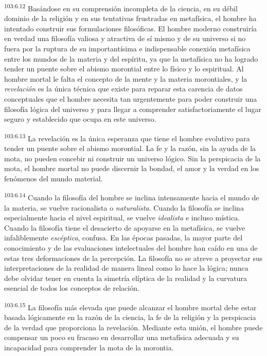 \documentclass[twoside, 11pt]{book}
\begin{document}
\par
\textsuperscript{103:6.12} Basándose en su comprensión incompleta de la ciencia, en su débil dominio de la religión y en sus tentativas frustradas en metafísica, el hombre ha intentado construir sus formulaciones filosóficas. El hombre moderno construiría en verdad una filosofía valiosa y atractiva de sí mismo y de su universo si no fuera por la ruptura de su importantísima e indispensable conexión metafísica entre los mundos de la materia y del espíritu, ya que la metafísica no ha logrado tender un puente sobre el abismo morontial entre lo físico y lo espiritual. Al hombre mortal le falta el concepto de la mente y la materia morontiales, y la \textit{revelación} es la única técnica que existe para reparar esta carencia de datos conceptuales que el hombre necesita tan urgentemente para poder construir una filosofía lógica del universo y para llegar a comprender satisfactoriamente el lugar seguro y establecido que ocupa en este universo.

\par
\textsuperscript{103:6.13} La revelación es la única esperanza que tiene el hombre evolutivo para tender un puente sobre el abismo morontial. La fe y la razón, sin la ayuda de la mota, no pueden concebir ni construir un universo lógico. Sin la perspicacia de la mota, el hombre mortal no puede discernir la bondad, el amor y la verdad en los fenómenos del mundo material.

\par
\textsuperscript{103:6.14} Cuando la filosofía del hombre se inclina intensamente hacia el mundo de la materia, se vuelve racionalista o \textit{naturalista}. Cuando la filosofía se inclina especialmente hacia el nivel espiritual, se vuelve \textit{idealista} e incluso mística. Cuando la filosofía tiene el desacierto de apoyarse en la metafísica, se vuelve infaliblemente \textit{escéptica}, confusa. En las épocas pasadas, la mayor parte del conocimiento y de las evaluaciones intelectuales del hombre han caído en una de estas tres deformaciones de la percepción. La filosofía no se atreve a proyectar sus interpretaciones de la realidad de manera lineal como lo hace la lógica; nunca debe olvidar tener en cuenta la simetría elíptica de la realidad y la curvatura esencial de todos los conceptos de relación.

\par
\textsuperscript{103:6.15} La filosofía más elevada que puede alcanzar el hombre mortal debe estar basada lógicamente en la razón de la ciencia, la fe de la religión y la perspicacia de la verdad que proporciona la revelación. Mediante esta unión, el hombre puede compensar un poco su fracaso en desarrollar una metafísica adecuada y su incapacidad para comprender la mota de la morontia.
\end{document}
